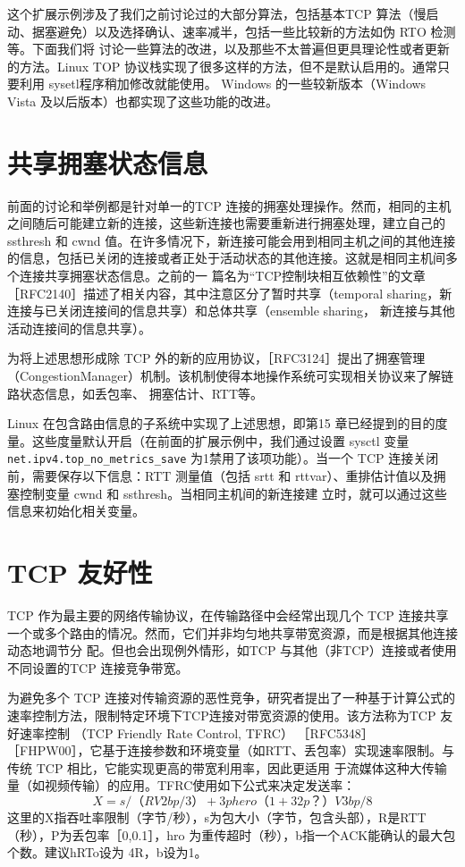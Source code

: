 这个扩展示例涉及了我们之前讨论过的大部分算法，包括基本TCP 算法（慢启动、据塞避免）以及选择确认、速率减半，包括一些比较新的方法如伪 RTO 检测等。下面我们将
讨论一些算法的改进，以及那些不太普遍但更具理论性或者更新的方法。Linux TOP 协议栈实现了很多这样的方法，但不是默认启用的。通常只要利用 sysetl程序稍加修改就能使用。
Windows 的一些较新版本（Windows Vista 及以后版本）也都实现了这些功能的改进。

\section{共享拥塞状态信息}
前面的讨论和举例都是针对单一的TCP 连接的拥塞处理操作。然而，相同的主机之间随后可能建立新的连接，这些新连接也需要重新进行拥塞处理，建立自己的 ssthresh 和 cwnd
值。在许多情况下，新连接可能会用到相同主机之间的其他连接的信息，包括已关闭的连接或者正处于活动状态的其他连接。这就是相同主机间多个连接共享拥塞状态信息。之前的一
篇名为“TCP控制块相互依赖性”的文章［RFC2140］描述了相关内容，其中注意区分了暂时共享（temporal sharing，新连接与已关闭连接间的信息共享）和总体共享（ensemble sharing，
新连接与其他活动连接间的信息共享）。

为将上述思想形成除 TCP 外的新的应用协议，［RFC3124］提出了拥塞管理（CongestionManager）机制。该机制使得本地操作系统可实现相关协议来了解链路状态信息，如丢包率、
拥塞估计、RTT等。

Linux 在包含路由信息的子系统中实现了上述思想，即第15 章已经提到的目的度量。这些度量默认开启（在前面的扩展示例中，我们通过设置 sysctl 变量 \verb|net.ipv4.top_no_metrics_save|
为1禁用了该项功能）。当一个 TCP 连接关闭前，需要保存以下信息：RTT 测量值（包括 srtt 和 rttvar）、重排估计值以及拥塞控制变量 cwnd 和 ssthresh。当相同主机间的新连接建
立时，就可以通过这些信息来初始化相关变量。

\section{TCP 友好性}
TCP 作为最主要的网络传输协议，在传输路径中会经常出现几个 TCP 连接共享一个或多个路由的情况。然而，它们并非均匀地共享带宽资源，而是根据其他连接动态地调节分
配。但也会出现例外情形，如TCP 与其他（非TCP）连接或者使用不同设置的TCP 连接竞争带宽。

为避免多个 TCP 连接对传输资源的恶性竞争，研究者提出了一种基于计算公式的速率控制方法，限制特定环境下TCP连接对带宽资源的使用。该方法称为TCP 友好速率控制
（TCP Friendly Rate Control, TFRC） ［RFC5348］ ［FHPW00］，它基于连接参数和环境变量（如RTT、丢包率）实现速率限制。与传统 TCP 相比，它能实现更高的带宽利用率，因此更适用
于流媒体这种大传输量（如视频传输）的应用。TFRC使用如下公式来决定发送率：
\begin{equation}
    X=s/（R V2bp/3） + 3phero（1 + 32p？）V3bp/8
\end{equation}
这里的X指吞吐率限制（字节/秒），s为包大小（字节，包含头部），R是RTT（秒），P为丢包率［0,0.1］，hro 为重传超时（秒），b指一个ACK能确认的最大包个数。建议hRTo设为
4R，b设为1。

